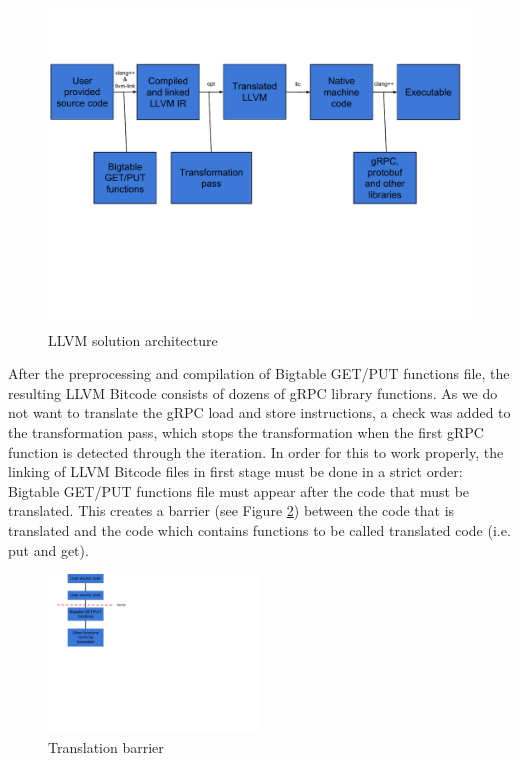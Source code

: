 \documentclass[bsc,frontabs,twoside,singlespacing,parskip,deptreport]{infthesis}     %
\begin{document}
\begin{figure}[H]
\centering
\includegraphics[width=1\textwidth]{images/architecture}
\caption{LLVM solution architecture}
\label{fig:architecture}
\end{figure}

After the preprocessing and compilation of Bigtable GET/PUT functions file, the resulting LLVM Bitcode consists of dozens of gRPC library functions. As we do not want to translate the gRPC load and store instructions, a check was added to the transformation pass, which stops the transformation when the first gRPC function is detected through the iteration. In order for this to work properly, the linking of LLVM Bitcode files in first stage must be done in a strict order: Bigtable GET/PUT functions file must appear after the code that must be translated. This creates a barrier (see Figure \ref{fig:barrier}) between the code that is translated and the code which contains functions to be called translated code (i.e. put and get).

\begin{figure}[H]
\centering
\includegraphics[width=0.5\textwidth]{images/barrier}
\caption{Translation barrier}
\label{fig:barrier}
\end{figure}
\end{document}
